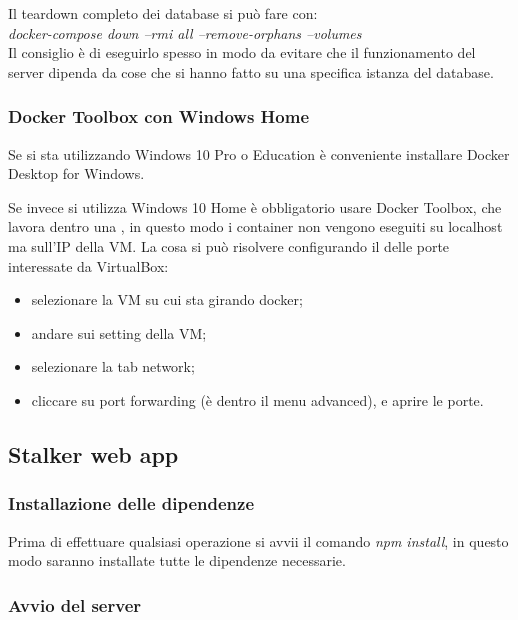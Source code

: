 \documentclass[../manuale-sviluppatore.tex]{subfiles}
\begin{document}
Il teardown completo dei database si può fare con:\\

\emph{docker-compose down --rmi all --remove-orphans --volumes}\\

Il consiglio è di eseguirlo spesso in modo da evitare che il funzionamento del server dipenda da cose che si hanno fatto su una specifica istanza del database.

\subsubsection{Docker Toolbox con Windows Home}

Se si sta utilizzando Windows 10 Pro o Education è conveniente installare Docker Desktop for Windows.

Se invece si utilizza Windows 10 Home è obbligatorio usare Docker Toolbox, che lavora dentro una , 
in questo modo i container non vengono eseguiti su localhost ma sull'IP della VM.%
La cosa si può risolvere configurando il  delle porte interessate da VirtualBox:

\begin{itemize}
\item selezionare la VM su cui sta girando docker;
\item andare sui setting della VM;%
\item selezionare la tab network;
\item cliccare su port forwarding (è dentro il menu advanced), e aprire le porte.
\end{itemize}

\subsection{Stalker web app}

\subsubsection{Installazione delle dipendenze}

Prima di effettuare qualsiasi operazione si avvii il comando \emph{npm install}, in questo modo saranno installate tutte le dipendenze necessarie.\\

\subsubsection{Avvio del server}
\end{document}
